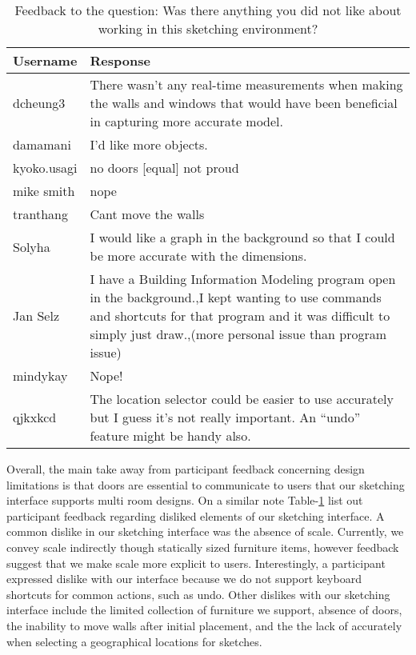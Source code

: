 \begin{table}[h]
\centering
\begin{tabular}{|p{}|p{}|}
\hline
\rowcolor[HTML]{EFEFEF} 
\textbf{Username} & \textbf{Response} \\ \hline
dcheung3 & There wasn't any real-time measurements when making the walls and windows that would have been beneficial in capturing more accurate model. \\ \hline
damamani & I'd like more objects. \\ \hline
kyoko.usagi & no doors {[}equal{]} not proud \\ \hline
mike smith & nope \\ \hline
tranthang & Cant move the walls \\ \hline
Solyha & I would like a graph in the background so that I could be more accurate with the dimensions. \\ \hline
Jan Selz & I have a Building Information Modeling program open in the background.,I kept wanting to use commands and shortcuts for that program and it was difficult to simply just draw.,(more personal issue than program issue) \\ \hline
mindykay & Nope! \\ \hline
qjkxkcd & The location selector could be easier to use accurately but I guess it's not really important. An ``undo'' feature might be handy also. \\ \hline
\end{tabular}
\caption{Feedback to the question: Was there anything you did not like about working in this sketching environment?}
\label{fig:dislike}
\end{table}

Overall, the main take away from participant feedback concerning design limitations is that doors are essential to communicate to users that our sketching interface supports multi room designs.
On a similar note Table-\ref{fig:dislike} list out participant feedback regarding disliked elements of our sketching interface.
A common dislike in our sketching interface was the absence of scale.
Currently, we convey scale indirectly though statically sized furniture items, however feedback suggest that we make scale more explicit to users.
Interestingly, a participant expressed dislike with our interface because we do not support keyboard shortcuts for common actions, such as undo.
Other dislikes with our sketching interface include the limited collection of furniture we support, absence of doors, the inability to move walls after initial placement, and the the lack of accurately when selecting a geographical locations for sketches.\\

